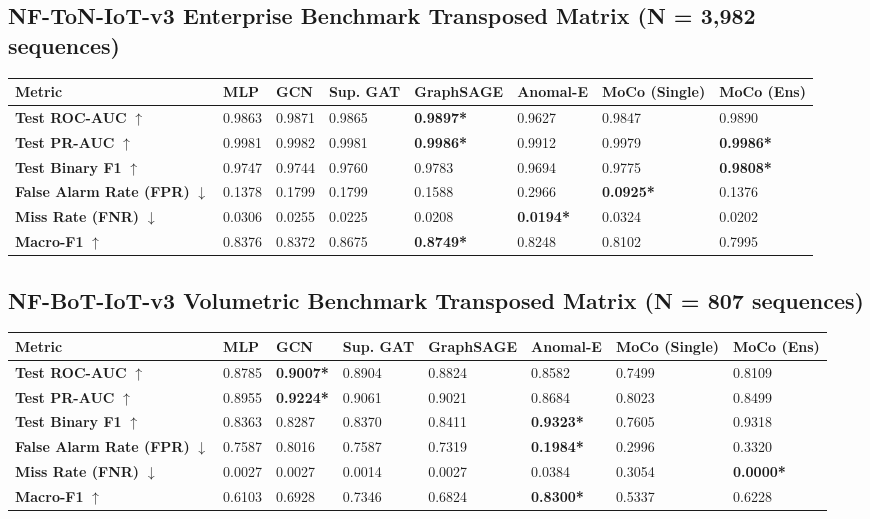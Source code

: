 \documentclass[10pt,a4paper]{article}
\newcommand{\best}[1]{\textbf{\textcolor{bestgreen}{#1*}}}
\begin{document}
\subsection{NF-ToN-IoT-v3 Enterprise Benchmark Transposed Matrix (N = 3,982 sequences)}
\begin{table}[htbp]
\centering
\small
\begin{tabularx}{\textwidth}{lXXXXXXX}
\toprule
\textbf{Metric} & \textbf{MLP} & \textbf{GCN} & \textbf{Sup. GAT} & \textbf{GraphSAGE} & \textbf{Anomal-E} & \textbf{MoCo (Single)} & \textbf{MoCo (Ens)} \\
\midrule
\textbf{Test ROC-AUC} $\uparrow$ & 0.9863 & 0.9871 & 0.9865 & \best{0.9897} & 0.9627 & 0.9847 & 0.9890 \\
\textbf{Test PR-AUC} $\uparrow$ & 0.9981 & 0.9982 & 0.9981 & \best{0.9986} & 0.9912 & 0.9979 & \best{0.9986} \\
\textbf{Test Binary F1} $\uparrow$ & 0.9747 & 0.9744 & 0.9760 & 0.9783 & 0.9694 & 0.9775 & \best{0.9808} \\
\textbf{False Alarm Rate (FPR)} $\downarrow$ & 0.1378 & 0.1799 & 0.1799 & 0.1588 & 0.2966 & \best{0.0925} & 0.1376 \\
\textbf{Miss Rate (FNR)} $\downarrow$ & 0.0306 & 0.0255 & 0.0225 & 0.0208 & \best{0.0194} & 0.0324 & 0.0202 \\
\textbf{Macro-F1} $\uparrow$ & 0.8376 & 0.8372 & 0.8675 & \best{0.8749} & 0.8248 & 0.8102 & 0.7995 \\
\bottomrule
\end{tabularx}
\end{table}

\subsection{NF-BoT-IoT-v3 Volumetric Benchmark Transposed Matrix (N = 807 sequences)}
\begin{table}[htbp]
\centering
\small
\begin{tabularx}{\textwidth}{lXXXXXXX}
\toprule
\textbf{Metric} & \textbf{MLP} & \textbf{GCN} & \textbf{Sup. GAT} & \textbf{GraphSAGE} & \textbf{Anomal-E} & \textbf{MoCo (Single)} & \textbf{MoCo (Ens)} \\
\midrule
\textbf{Test ROC-AUC} $\uparrow$ & 0.8785 & \best{0.9007} & 0.8904 & 0.8824 & 0.8582 & 0.7499 & 0.8109 \\
\textbf{Test PR-AUC} $\uparrow$ & 0.8955 & \best{0.9224} & 0.9061 & 0.9021 & 0.8684 & 0.8023 & 0.8499 \\
\textbf{Test Binary F1} $\uparrow$ & 0.8363 & 0.8287 & 0.8370 & 0.8411 & \best{0.9323} & 0.7605 & 0.9318 \\
\textbf{False Alarm Rate (FPR)} $\downarrow$ & 0.7587 & 0.8016 & 0.7587 & 0.7319 & \best{0.1984} & 0.2996 & 0.3320 \\
\textbf{Miss Rate (FNR)} $\downarrow$ & 0.0027 & 0.0027 & 0.0014 & 0.0027 & 0.0384 & 0.3054 & \best{0.0000} \\
\textbf{Macro-F1} $\uparrow$ & 0.6103 & 0.6928 & 0.7346 & 0.6824 & \best{0.8300} & 0.5337 & 0.6228 \\
\bottomrule
\end{tabularx}
\end{table}
\end{document}
